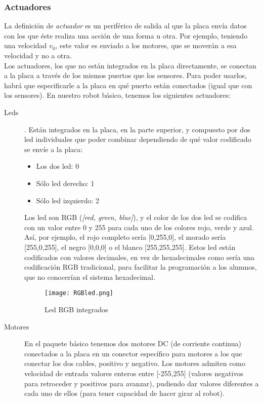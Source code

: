 \subsubsection{Actuadores}\label{ssubsec:actuadores}
	La definición de \textit{actuador} es un periférico de salida al que la placa envía datos con los que éste realiza una acción de una forma u otra. Por ejemplo, teniendo una velocidad $v_0$, este valor es enviado a los motores, que se moverán a esa velocidad y no a otra. \\
	Los actuadores, los que no están integrados en la placa directamente, se conectan a la placa a través de los mismos puertos que los sensores. Para poder usarlos, habrá que especificarle a la placa en qué puerto están conectados (igual que con los sensores). En nuestro robot básico, tenemos los siguientes actuadores:
	\begin{description}
		\item [Leds]. Están integrados en la placa, en la parte superior, y compuesto por dos led individuales que poder combinar dependiendo de qué valor codificado se envíe a la placa:
		\begin{itemize}
			\item Los dos led: 0
			\item Sólo led derecho: 1
			\item Sólo led izquierdo: 2
		\end{itemize}
		Los led son RGB (\textit{[red, green, blue]}), y el color de los dos led se codifica con un valor entre 0 y 255 para cada uno de los colores rojo, verde y azul. Así, por ejemplo, el rojo completo sería [0,255,0], el morado sería [255,0,255], el negro [0,0,0] o el blanco [255,255,255]. Estos led están codificados con valores decimales, en vez de hexadecimales como sería una codificación RGB tradicional, para facilitar la programación a los alumnos, que no conocerían el sistema hexadecimal.
		\begin{figure}[H]
			\texttt{[image: RGBled.png]}
			\centering
			\label{img:led}
			\caption{Led RGB integrados}
		\end{figure}
		\item [Motores] En el paquete básico tenemos dos motores DC (de corriente continua) conectados a la placa en un conector específico para motores a los que conectar los dos cables, positivo y negativo. Los motores admiten como velocidad de entrada valores enteros entre [-255,255] (valores negativos para retroceder y positivos para avanzar), pudiendo dar valores diferentes a cada uno de ellos (para tener capacidad de hacer girar al robot).

\end{description}
